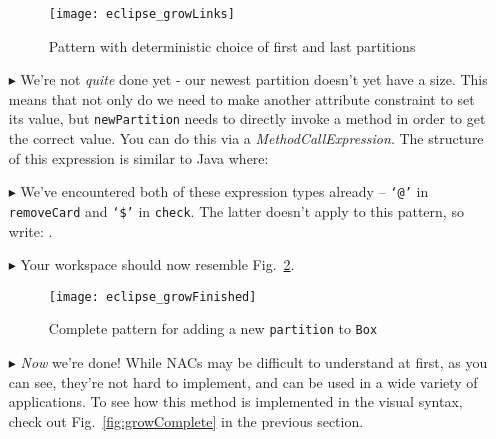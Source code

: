 \begin{itemize}
\begin{figure}[htp]
\begin{center}
  \texttt{[image: eclipse\_growLinks]}
  \caption{Pattern  with deterministic choice of first and last partitions}
  \label{fig:growAllLinks}
\end{center}
\end{figure}

\item[$\blacktriangleright$] We're not \emph{quite} done yet - our newest partition doesn't yet have a size. This means that not only do we need to make
another attribute constraint to set its value, but \texttt{newPartition} needs to directly invoke a method in order to get the correct value. You can do this
via a \emph{MethodCallExpression}. The structure of this expression is similar to Java where:

\item[$\blacktriangleright$] We've encountered both of these expression types already -- \texttt{`@'} in \texttt{removeCard} and \texttt{`\$'} in
\texttt{check}. The latter doesn't apply to this pattern, so write: .

\item[$\blacktriangleright$] Your workspace should now resemble Fig.~\ref{fig:patternComplete}.

\vspace{0.5cm}

\begin{figure}[htp]
\begin{center}
  \texttt{[image: eclipse\_growFinished]}
  \caption{Complete pattern for adding a new \texttt{partition} to \texttt{Box}}
  \label{fig:patternComplete}
\end{center}
\end{figure}

\vspace{0.5cm}

\item[$\blacktriangleright$] \emph{Now} we're done! While NACs may be difficult to understand at first, as you can see, they're not hard to implement, and
can be used in a wide variety of applications. To see how this method is implemented in the visual syntax, check out Fig.~\ref{fig:growComplete} in the
previous section.

\end{itemize}